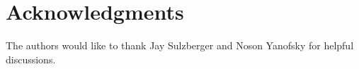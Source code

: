 



\let\ref\autoref

{}
\tableofcontents
\listoffigures
\pagebreak
{}



\listoftodos

%


%

%





%

\section{Acknowledgments}
The authors would like to thank Jay Sulzberger and Noson Yanofsky for helpful discussions.

